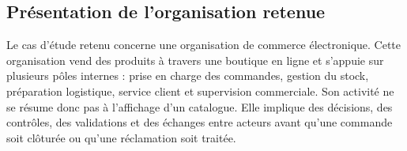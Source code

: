 

\label{sec:chap4-cas-etude}

\subsection{Présentation de l'organisation retenue}

Le cas d'étude retenu concerne une organisation de commerce électronique. Cette organisation vend des produits à travers une boutique en ligne et s'appuie sur plusieurs pôles internes : prise en charge des commandes, gestion du stock, préparation logistique, service client et supervision commerciale. Son activité ne se résume donc pas à l'affichage d'un catalogue. Elle implique des décisions, des contrôles, des validations et des échanges entre acteurs avant qu'une commande soit clôturée ou qu'une réclamation soit traitée.



